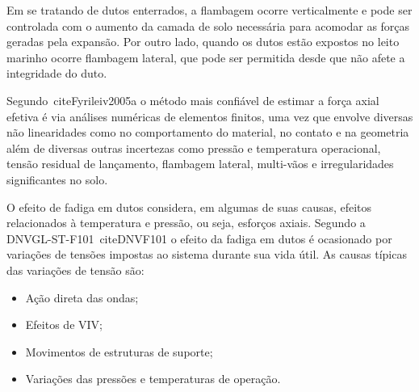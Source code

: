 Em se tratando de dutos enterrados, a flambagem ocorre verticalmente e pode ser controlada com o aumento da camada de solo necessária para acomodar as forças geradas pela expansão.
Por outro lado, quando os dutos estão expostos no leito marinho ocorre flambagem lateral, que pode ser permitida desde que não afete a integridade do duto.

Segundo~cite{Fyrileiv2005a} o método mais confiável de estimar a força axial efetiva é via análises numéricas de elementos finitos, uma vez que envolve diversas não linearidades como no comportamento do material, no contato e na geometria além de diversas outras incertezas como pressão e temperatura operacional, tensão residual de lançamento, flambagem lateral, multi-vãos e irregularidades significantes no solo.

O efeito de fadiga em dutos considera, em algumas de suas causas, efeitos relacionados à temperatura e pressão, ou seja, esforços axiais.
Segundo a \mbox{DNVGL-ST-F101}~cite{DNVF101} o efeito da fadiga em dutos é ocasionado por variações de tensões impostas ao sistema durante sua vida útil.
As causas típicas das variações de tensão são:
	\begin{itemize}
		\item Ação direta das ondas;
		\item Efeitos de VIV;
		\item Movimentos de estruturas de suporte;
		\item Variações das pressões e temperaturas de operação.
	\end{itemize}








